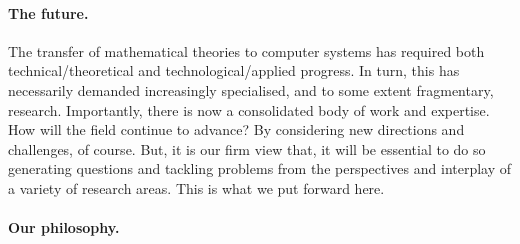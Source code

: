 \documentclass[11pt,twocolumn]{article}
\begin{document}
\paragraph*{The future.}

The transfer of mathematical theories to computer systems has required
both technical/theoretical and technological/applied progress.  In turn,
this has necessarily demanded increasingly specialised, and to some extent
fragmentary, research.  Importantly, there is now a consolidated body of
work and expertise.  How will the field continue to advance?  By
considering new directions and challenges, of course.  But, it is our firm
view that, %
it will be essential to do so generating questions and tackling problems
from the perspectives and interplay of a variety of research areas.  This
is %
what we put forward here.

\paragraph*{Our philosophy.}
\end{document}
